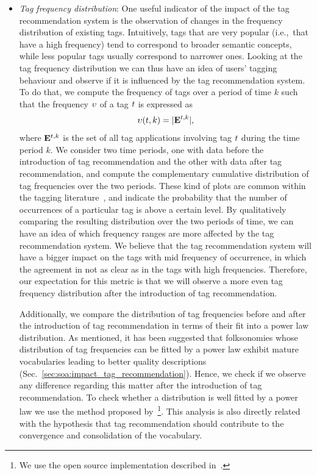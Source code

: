 \begin{itemize}
	\item \textit{Tag frequency distribution}: One useful indicator of the impact of the tag recommendation system is the observation of changes in the frequency distribution of existing tags. 
Intuitively, tags that are very popular (i.e.,~that have a high frequency) tend to correspond to broader semantic concepts, while less popular tags usually correspond to narrower ones. Looking at the tag frequency distribution we can thus have an idea of users' tagging behaviour and observe if it is influenced by the tag recommendation system.
To do that, we compute the frequency of tags over a period of time $k$ such that the frequency $\upsilon$ of a tag $t$ is expressed as
\begin{equation} \upsilon(t,k) = |\mathbf{E}^{t,k}|, \label{impact:eq:tag_frequency} \end{equation}
where $\mathbf{E}^{t,k}$ is the set of all tag applications involving tag $t$ during the time period $k$. We consider two time periods, one with data before the introduction of tag recommendation and the other with data after tag recommendation, and compute the complementary cumulative distribution of tag frequencies over the two periods. These kind of plots are common within the tagging literature~\citep{Bischoff2008,Robu2009}, and indicate the probability that the number of occurrences of a particular tag is above a certain level. By qualitatively comparing the resulting distribution over the two periods of time, we can have an idea of which frequency ranges are more affected by the tag recommendation system. We believe that the tag recommendation system will have a bigger impact on the tags with mid frequency of occurrence, in which the agreement in not as clear as in the tags with high frequencies. Therefore, our expectation for this metric is that we will observe a more even tag frequency distribution after the introduction of tag recommendation.

Additionally, we compare the distribution of tag frequencies before and after the introduction of tag recommendation in terms of their fit into a power law distribution. As mentioned, it has been suggested that folksonomies whose distribution of tag frequencies can be fitted by a power law exhibit mature vocabularies leading to better quality descriptions (Sec.~\ref{sec:soa:impact_tag_recommendation}). %
Hence, we check if we observe any difference regarding this matter after the introduction of tag recommendation. %
To check whether a distribution is well fitted by a power law we use the method proposed by~\cite{Clauset2007}\footnote{We use the open source implementation described in~\cite{Alstott2014}.}.
This analysis is also directly related with the hypothesis that tag recommendation should contribute to the convergence and consolidation of the vocabulary.


\end{itemize}
